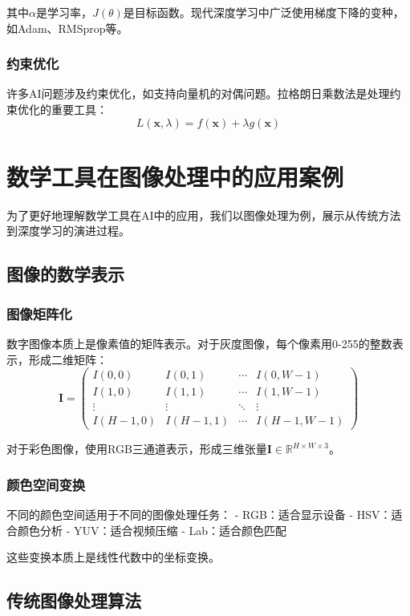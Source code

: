 其中$\alpha$是学习率，$J(\theta)$是目标函数。现代深度学习中广泛使用梯度下降的变种，如Adam、RMSprop等。

\subsubsection{约束优化}
许多AI问题涉及约束优化，如支持向量机的对偶问题。拉格朗日乘数法是处理约束优化的重要工具：
$$L(\mathbf{x}, \lambda) = f(\mathbf{x}) + \lambda g(\mathbf{x})$$

\section{数学工具在图像处理中的应用案例}

为了更好地理解数学工具在AI中的应用，我们以图像处理为例，展示从传统方法到深度学习的演进过程。

\subsection{图像的数学表示}

\subsubsection{图像矩阵化}
数字图像本质上是像素值的矩阵表示。对于灰度图像，每个像素用0-255的整数表示，形成二维矩阵：
$$\mathbf{I} = \begin{pmatrix}
I(0,0) & I(0,1) & \cdots & I(0,W-1) \\
I(1,0) & I(1,1) & \cdots & I(1,W-1) \\
\vdots & \vdots & \ddots & \vdots \\
I(H-1,0) & I(H-1,1) & \cdots & I(H-1,W-1)
\end{pmatrix}$$

对于彩色图像，使用RGB三通道表示，形成三维张量$\mathbf{I} \in \mathbb{R}^{H \times W \times 3}$。

\subsubsection{颜色空间变换}
不同的颜色空间适用于不同的图像处理任务：
- RGB：适合显示设备
- HSV：适合颜色分析
- YUV：适合视频压缩
- Lab：适合颜色匹配

这些变换本质上是线性代数中的坐标变换。

\subsection{传统图像处理算法}

